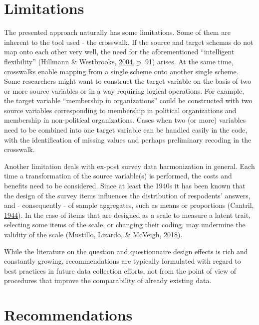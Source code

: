 \documentclass[12pt,]{article}
\begin{document}
\hypertarget{limitations}{%
\section{Limitations}\label{limitations}}

The presented approach naturally has some limitations. Some of them are inherent to the tool used - the crosswalk. If the source and target schemas do not map onto each other very well, the need for the aforementioned ``intelligent flexibility'' (Hillmann \& Westbrooks, \protect\hyperlink{ref-Hillmann2004}{2004}, p. 91) arises. At the same time, crosswalks enable mapping from a single scheme onto another single scheme. Some researchers might want to construct the target variable on the basis of two or more source variables or in a way requiring logical operations. For example, the target variable ``membership in organizations'' could be constructed with two source variables corresponding to membership in political organizations and membership in non-political organizations. Cases when two (or more) variables need to be combined into one target variable can be handled easily in the code, with the identification of missing values and perhaps preliminary recoding in the crosswalk.

Another limitation deals with ex-post survey data harmonization in general. Each time a transformation of the source variable(s) is performed, the costs and benefits need to be considered. Since at least the 1940s it has been known that the design of the survey items influences the distribution of respodents' answers, and - consequently - of sample aggregates, such as means or proportions (Cantril, \protect\hyperlink{ref-Cantril1944}{1944}). In the case of items that are designed as a scale to measure a latent trait, selecting some items of the scale, or changing their coding, may undermine the validity of the scale (Mustillo, Lizardo, \& McVeigh, \protect\hyperlink{ref-Mustillo2018}{2018}).

While the literature on the question and questionnaire design effects is rich and constantly growing, recommendations are typically formulated with regard to best practices in future data collection efforts, not from the point of view of procedures that improve the comparability of already existing data.

\hypertarget{recommendations}{%
\section{Recommendations}\label{recommendations}}
\end{document}
